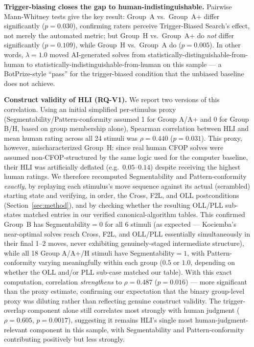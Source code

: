 \documentclass[10pt,conference]{article}
\begin{document}
\textbf{Trigger-biasing closes the gap to human-indistinguishable.}
Pairwise Mann-Whitney tests give the key result: Group~A vs.\
Group~A+ differ significantly ($p=0.030$), confirming raters
perceive Trigger-Biased Search's effect, not merely the automated
metric; but Group~H vs.\ Group~A+ do \emph{not} differ significantly
($p=0.109$), while Group~H vs.\ Group~A do ($p=0.005$). In other
words, $\lambda=1.0$ moved AI-generated solves from
statistically-distinguishable-from-human to
statistically-indistinguishable-from-human on this sample --- a
BotPrize-style ``pass'' for the trigger-biased condition that the
unbiased baseline does not achieve.

\textbf{Construct validity of HLI (RQ-V1).} We report two versions
of this correlation. Using an initial simplified per-stimulus proxy
(Segmentability/Pattern-conformity assumed 1 for Group A/A+ and 0
for Group B/H, based on group membership alone), Spearman
correlation between HLI and mean human rating across all 24 stimuli
was $\rho=0.440$ ($p=0.031$). This proxy, however, mischaracterized
Group~H: since real human CFOP solves were assumed
non-CFOP-structured by the same logic used for the computer
baseline, their HLI was artificially deflated (e.g.\ $0.05$--$0.14$)
despite receiving the highest human ratings. We therefore recomputed
Segmentability and Pattern-conformity \emph{exactly}, by replaying
each stimulus's move sequence against its actual (scrambled) starting
state and verifying, in order, the Cross, F2L, and OLL
postconditions (Section~\ref{sec:method}), and by checking whether
the resulting OLL/PLL sub-states matched entries in our verified
canonical-algorithm tables. This confirmed Group~B has
Segmentability$=0$ for all 6 stimuli (as expected --- Kociemba's
near-optimal solves reach Cross, F2L, and OLL/PLL essentially
simultaneously in their final 1--2 moves, never exhibiting
genuinely-staged intermediate structure), while all 18 Group
A/A+/H stimuli have Segmentability$=1$, with Pattern-conformity
varying meaningfully within each group ($0.5$ or $1.0$, depending on
whether the OLL and/or PLL sub-case matched our table). With this
exact computation, correlation \emph{strengthens} to
$\rho=0.487$ ($p=0.016$) --- more significant than the proxy
estimate, confirming our expectation that the binary group-level
proxy was diluting rather than reflecting genuine construct
validity. The trigger-overlap component alone still correlates most
strongly with human judgment ($\rho=0.605$, $p=0.0017$), suggesting
it remains HLI's single most human-judgment-relevant component in
this sample, with Segmentability and Pattern-conformity contributing
positively but less strongly.
\end{document}
